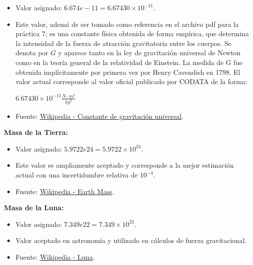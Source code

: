 \documentclass[12pt,letterpaper]{article}
\begin{document}
\begin{itemize}
\item Valor asignado: $6.674e-11 = 6.67430 \times 10^{-11}$.
  
\item Este valor, adem\'{a} de ser tomado como referencia en el archivo pdf para la pr\'{a}ctica 7; es una constante física obtenida de forma empírica, que determina la intensidad de la fuerza de atracción gravitatoria entre los cuerpos. Se denota por $G$ y aparece tanto en la ley de gravitación universal de Newton como en la teoría general de la relatividad de Einstein. La medida de G fue obtenida implícitamente por primera vez por Henry Cavendish en 1798. El valor actual corresponde al valor oficial publicado por CODATA de la forma:
  
  \begin{center}
  $6.67430 \times 10^{-11} \frac{N \cdot m^2}{kg^2}$
  \end{center}

\item Fuente: \href{https://es.wikipedia.org/wiki/Constante_de_gravitaci\%C3\%B3n_universal}{Wikipedia - Constante de gravitación universal}.
\end{itemize}


\textbf{Masa de la Tierra:}

\begin{itemize}
\item Valor asignado: $5.9722e24 = 5.9722 \times 10^{24}$.
  
\item Este valor es ampliamente aceptado y corresponde a la mejor estimación actual con una incertidumbre relativa de $10^{-4}$.
  
\item Fuente: \href{https://en.wikipedia.org/wiki/Earth_mass}{Wikipedia - Earth Mass}.
\end{itemize}

\textbf{Masa de la Luna:}

\begin{itemize}
\item Valor asignado: $7.349e22 = 7.349 \times 10^{22}$.
  
\item Valor aceptado en astronomía y utilizado en cálculos de fuerza gravitacional.
  
\item Fuente: \href{https://es.wikipedia.org/wiki/Luna}{Wikipedia - Luna}.
\end{itemize}
\end{document}
